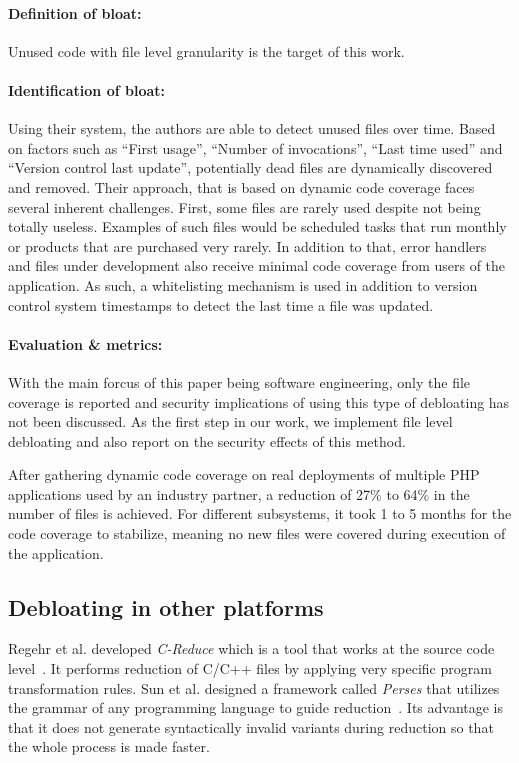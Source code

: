 \paragraph{Definition of bloat:} Unused code with file level granularity is the target of this work.
\paragraph{Identification of bloat:} Using their system, the authors are able to detect unused files over time. Based on factors such as ``First usage'', ``Number of invocations'', ``Last time used'' and ``Version control last update'', potentially dead files are dynamically discovered and removed. Their approach, that is based on dynamic code coverage faces several inherent challenges. First, some files are rarely used despite not being totally useless. Examples of such files would be scheduled tasks that run monthly or products that are purchased very rarely. In addition to that, error handlers and files under development also receive minimal code coverage from users of the application. As such, a whitelisting mechanism is used in addition to version control system timestamps to detect the last time a file was updated.
\paragraph{Evaluation \& metrics:} With the main forcus of this paper being software engineering, only the file coverage is reported and security implications of using this type of debloating has not been discussed. As the first step in our work, we implement file level debloating and also report on the security effects of this method.

After gathering dynamic code coverage on real deployments of multiple PHP applications used by an industry partner, a reduction of 27\% to 64\% in the number of files is achieved. For different subsystems, it took 1 to 5 months for the code coverage to stabilize, meaning no new files were covered during execution of the application.

\subsection{Debloating in other platforms}

Regehr et al. developed \textit{C-Reduce} which is a tool that works at the source code level~\cite{regehr2012CReduce}.
It performs reduction of C/C++ files by applying very specific program transformation rules.
Sun et al. designed a framework called \textit{Perses} that utilizes the grammar of any programming language to guide reduction~\cite{sun2018perses}.
Its advantage is that it does not generate syntactically invalid variants during reduction so that the whole process is made faster.

